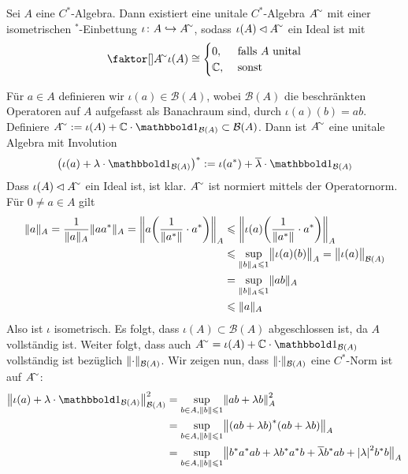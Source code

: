 \begin{satz}[label=satz:26,{name=[Unitalisierung]}]
	Sei $A$ eine $C^*$-Algebra. Dann existiert eine unitale $C^*$-Algebra $A^\simm$ mit einer isometrischen ${}^*$-Einbettung $\iota \colon A \hookrightarrow A^\simm$, sodass
	$\iota(A) \lhd A^\simm$ ein Ideal ist mit 
	\[
		\Faktor{A^\simm}{\iota(A)} \cong \begin{cases}
			0, &\text{ falls }A \text{ unital} \\
			\mathbb{C} , &\text{ sonst }  
		\end{cases}
	\]
\end{satz}
\begin{beweis}
	Für $a \in A$ definieren wir $\iota(a) \in \mathcal{B}(A)$, wobei $\mathcal{B}(A)$ die beschränkten Operatoren auf $A$ aufgefasst als Banachraum sind, durch
	$\iota(a)(b)=ab$. Definiere $A^\simm := \iota(A) + \mathbb{C} \cdot \ind_{\mathcal{B}(A)} \subset \mathcal{B}(A)$. Dann ist $A^\simm$ eine unitale Algebra mit Involution
	\[
		\enbrace*{\iota(a)+\lambda \cdot \ind_{\mathcal{B}(A)}}^* := \iota(a^*) + \overline{\lambda} \cdot \ind_{\mathcal{B}(A)}
	\]
	Dass $\iota(A) \lhd A^\simm$ ein Ideal ist, ist klar. $A^\simm$ ist normiert mittels der Operatornorm. Für $0 \neq a \in A$ gilt  
	\begin{align}
		\norm{a}_A = \frac{1}{\norm{a}_A}\norm{aa^*}_A = \norm*{a \enbrace*{\frac{1}{\norm{a^*} } \cdot a^*}}_A &\le \norm*{\iota(a) \enbrace*{\frac{1}{\norm{a^*}}\cdot a^* }}_A \\
		&\le \sup_{\norm{b}_A \le 1} \norm[\big]{\iota(a)(b)}_A = \norm[\big]{\iota(a)}_{\mathcal{B}(A)} \\
		&= \sup_{\norm{b}_A \le 1} \norm{ab}_A \\
		&\le \norm{a}_A   
	\end{align}
	Also ist $\iota$ isometrisch. Es folgt, dass $\iota(A) \subset \mathcal{B}(A)$ abgeschlossen ist, da $A$ vollständig ist. Weiter folgt, dass auch 
	$A^\simm = \iota(A) + \mathbb{C} \cdot \ind_{\mathcal{B}(A)}$ vollständig ist bezüglich $\norm{\cdot}_{\mathcal{B}(A)}$. Wir zeigen nun, dass $\norm{\cdot}_{\mathcal{B}(A)}$ 
	eine $C^*$-Norm ist auf $A^\simm$: 
	\begin{align}
		\norm*{\iota(a)+ \lambda \cdot \ind_{\mathcal{B}(A)}}_{\mathcal{B}(A)}^2 &= \sup_{b \in A, \norm{b} \le 1 } \norm*{ab + \lambda b}^2_A \\
		&= \sup_{b \in A, \norm{b} \le 1} \norm[\big]{\enbrace*{ab+\lambda b}^* (ab +\lambda b)}_A \\
		&= \sup_{b \in A, \norm{b} \le 1} \norm[\big]{b^* a^* ab + \lambda b^* a^* b + \overline{\lambda} b^* ab + \abs*{\lambda}^2 b^* b}_{A} \\

\end{align}
\end{beweis}
